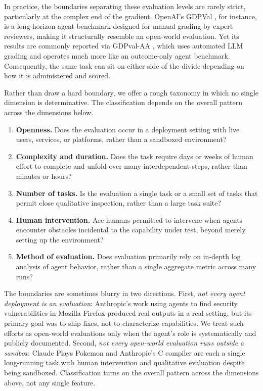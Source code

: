 \documentclass{article}
\begin{document}
In practice, the boundaries separating these evaluation levels are rarely strict, particularly at the complex end of the gradient. OpenAI's GDPVal \citep{openaiComIndexGdpval}, for instance, is a long-horizon agent benchmark designed for manual grading by expert reviewers, making it structurally resemble an open-world evaluation. Yet its results are commonly reported via GDPval-AA \citep{artificialanalysisAiEvaluationsGdpval}, which uses automated LLM grading and operates much more like an outcome-only agent benchmark. Consequently, the same task can sit on either side of the divide depending on how it is administered and scored.

Rather than draw a hard boundary, we offer a rough taxonomy in which no single dimension is determinative. The classification depends on the overall pattern across the dimensions below.

\begin{taxbox}
\begin{enumerate}[label={\textcircled{\scriptsize\arabic*}}, leftmargin=*, itemsep=2pt, topsep=2pt, parsep=0pt, labelsep=4pt]
\item \textbf{Openness.} Does the evaluation occur in a deployment setting with live users, services, or platforms, rather than a sandboxed environment?
\item \textbf{Complexity and duration.} Does the task require days or weeks of human effort to complete and unfold over many interdependent steps, rather than minutes or hours?
\item \textbf{Number of tasks.} Is the evaluation a single task or a small set of tasks that permit close qualitative inspection, rather than a large task suite?
\item \textbf{Human intervention.} Are humans permitted to intervene when agents encounter obstacles incidental to the capability under test, beyond merely setting up the environment?
\item \textbf{Method of evaluation.} Does evaluation primarily rely on in-depth log analysis of agent behavior, rather than a single aggregate metric across many runs?
\end{enumerate}
\end{taxbox}

The boundaries are sometimes blurry in two directions. First, \emph{not every agent deployment is an evaluation}: Anthropic's work using agents to find security vulnerabilities in Mozilla Firefox \citep{anthropicComNewsMozilla} produced real outputs in a real setting, but its primary goal was to ship fixes, not to characterize capabilities. We treat such efforts as open-world evaluations only when the agent's role is systematically and publicly documented. Second, \emph{not every open-world evaluation runs outside a sandbox}: Claude Plays Pokemon \citep{futurismComAdvancedAi} and Anthropic's C compiler \citep{anthropicComEngineeringBuilding} are each a single long-running task with human intervention and qualitative evaluation despite being sandboxed. Classification turns on the overall pattern across the dimensions above, not any single feature.
\end{document}
